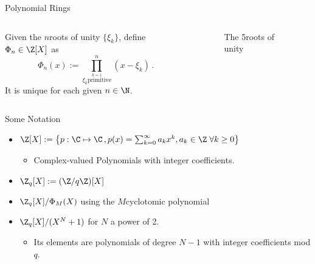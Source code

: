 \begin{frame}{Polynomial Rings}
  \begin{columns}
    \begin{column}{0.6\linewidth}
      \begin{definition}
        Given the $n$\th roots of unity $\{\xi_k\}$, define $\Phi_n \in \Z[X]$ as
        $$\Phi_n(x) := \prod_{\stackrel{k=1}{\xi_k \mathrm{primitive}}}^{n} (x - \xi_k) \,.$$
        It is unique for each given $n \in \N$.
      \end{definition}
    \end{column}
    \begin{column}{0.32\linewidth}
      \begin{figure}
        \caption{The 5\th roots of unity}
        \label{fig:nth-roots-of-unity}
      \end{figure}
    \end{column}
  \end{columns}
\end{frame}

\begin{frame}{Some Notation}
  \begin{itemize}
    \item $\Z[X] := \big\{p: \C \mapsto \C \,, p(x) = \sum_{k=0}^\infty a_k x^k, a_k \in \Z \;\forall k \geq 0\big\}$
          \begin{itemize}
            \item Complex-valued Polynomials with integer coefficients.
          \end{itemize}
    \item $\Z_q[X] := (\Z/q\Z)[X]$
    \item $\Z_q[X] / \Phi_M(X)$ using the $M$\th cyclotomic polynomial
    \item $\Z_q[X]/(X^N+1)$ for $N$ a power of 2.
          \begin{itemize}
            \item Its elements are polynomials of degree $N-1$ with integer coefficients mod $q$.
          \end{itemize}
  \end{itemize}
\end{frame}


